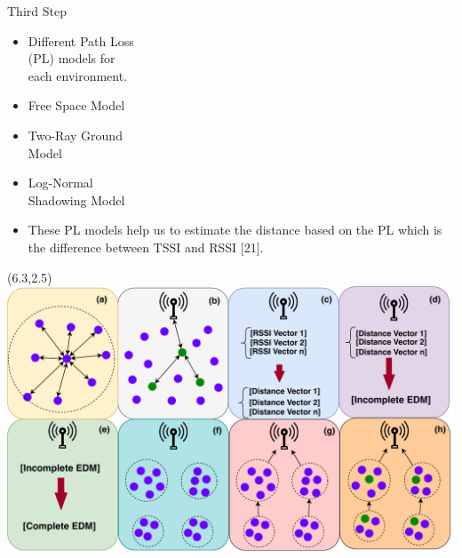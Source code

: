 \documentclass{beamer}
\begin{document}
\begin{frame}[t]{Third Step} %
\small
\begin{itemize}
\item Different Path Loss \\ (PL) models for \\ each environment.

\item Free Space Model

\item Two-Ray Ground \\ Model

\item Log-Normal \\ Shadowing Model

\item These PL models help us to estimate the distance based on the PL which is the difference between TSSI and RSSI [21].
\end{itemize}

\begin{textblock}{0.8}(6.3,2.5)
\includegraphics[scale=0.35]{figure/Steps.pdf}
\end{textblock}
\end{frame}
\end{document}

